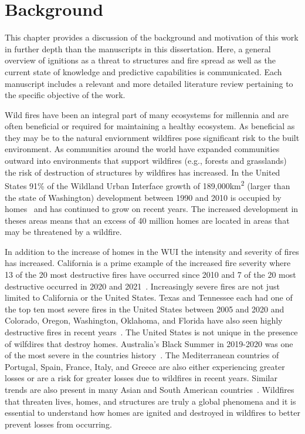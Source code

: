 
\chapter{Background}
\label{part:literature}
    This chapter provides a discussion of the background and motivation of this work in further depth than the manuscripts in this dissertation.  Here, a general overview of ignitions as a threat to structures and fire spread as well as the current state of knowledge and predictive capabilities is communicated. Each manuscript includes a relevant and more detailed literature review pertaining to the specific objective of the work. 

    Wild fires have been an integral part of many ecosystems for millennia and are often beneficial or required for maintaining a healthy ecosystem. As beneficial as they may be to the natural enviornment wildfires pose significant risk to the built environment. As communities around the world have expanded communities outward into environments that support wildfires (e.g., forests and grasslands) the risk of destruction of structures by wildfires has increased. In the United States 91\% of the Wildland Urban Interface  growth of 189,000\si{\kilo\meter\squared} (larger than the state of Washington) development between 1990 and 2010 is occupied by homes~\cite{Radeloff2017} and has continued to grow on recent years. The increased development in theses areas means that an excess of 40 million homes are located in areas that may be threatened by a wildfire. 
    
    In addition to the increase of homes in the WUI the intensity and severity of fires has increased. California is a prime example of the increased fire severity where 13 of the 20 most destructive fires have occurred since 2010 and 7 of the 20 most destructive occurred in 2020 and 2021~\cite{CALFIRE2018}. Increasingly severe fires are not just limited to California or the United States. Texas and Tennessee each had one of the top ten most severe fires in the United States between 2005 and 2020 and Colorado, Oregon, Washington, Oklahoma, and Florida have also seen highly destructive fires in recent years~\cite{Barrett2020}. The United States is not unique in the presence of wilfdires that destroy homes. Australia's Black Summer in 2019-2020 was one of the most severe in the countries history~\cite{Levin2021}. The Mediterranean countries of Portugal, Spain, France, Italy, and Greece are also either experiencing greater losses or are a risk for greater losses due to wildfires in recent years. Similar trends are also present in many Asian and South American countries~\cite{Manzello2018}. Wildfires that threaten lives, homes, and structures are truly a global phenomena and it is essential to understand how homes are ignited and destroyed in wildfires to better prevent losses from occurring. 
    
